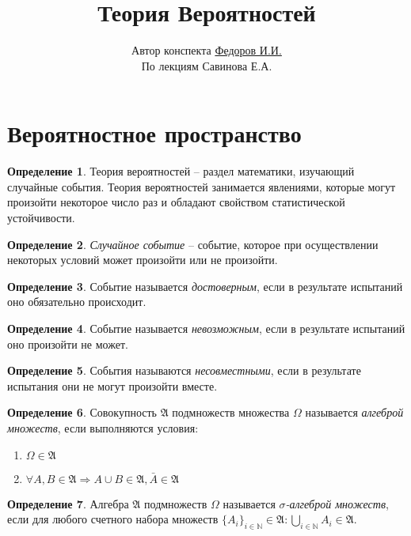 \documentclass[10pt,twoside]{article}
\title{Теория Вероятностей}
\author{Автор конспекта \href{http://vk.com/beizero}{Федоров И.И.}\\По лекциям Савинова Е.А.}
\theoremstyle{plain}
\theoremstyle{definition}
\newtheorem{defi}{Определение}
\begin{document}
\maketitle
\tableofcontents

\section{Вероятностное пространство}

\begin{defi}
Теория вероятностей -- раздел математики, изучающий случайные события. Теория вероятностей занимается явлениями, которые могут произойти некоторое число раз и обладают свойством статистической устойчивости.
\end{defi}

\begin{defi}
\textit{Случайное событие} -- событие, которое при осуществлении некоторых условий может произойти или не произойти.
\end{defi}

\begin{defi}
Событие называется \textit{достоверным}, если в результате испытаний оно обязательно происходит.
\end{defi}

\begin{defi}
Событие называется \textit{невозможным}, если в результате испытаний оно произойти не может.
\end{defi}

\begin{defi}
События называются \textit{несовместными}, если в результате испытания они не могут произойти вместе.
\end{defi}

\begin{defi}
Совокупность $\mathfrak{A}$ подмножеств множества $\Omega$ называется \textit{алгеброй множеств}, если выполняются условия:
\begin{enumerate}
\item $\Omega\in \mathfrak{A}$
\item $\forall A,B\in \mathfrak{A}\Rightarrow A\cup B\in\mathfrak{A},\bar{A}\in\mathfrak{A}$
\end{enumerate}
\end{defi}

\begin{defi}
Алгебра $\mathfrak{A}$ подмножеств $\Omega$ называется \textit{$\sigma$-алгеброй множеств}, если для любого счетного набора множеств $\{A_i\}_{i\in \mathbb{N}}\in\mathfrak{A}:\bigcup\limits_{i\in \mathbb{N}}A_i\in\mathfrak{A}$.
\end{defi}
\end{document}
